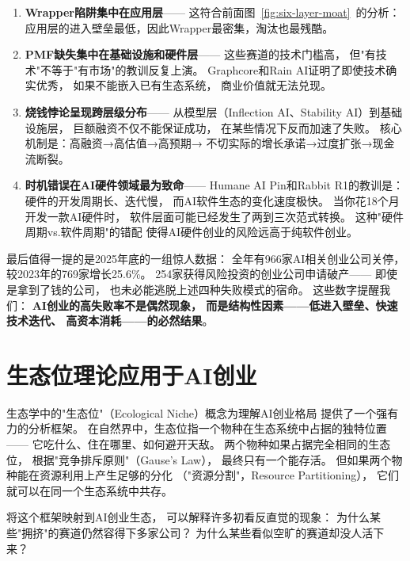\begin{enumerate}
  \item \textbf{Wrapper陷阱集中在应用层}——
    这符合前面图~\ref{fig:six-layer-moat}~的分析：
    应用层的进入壁垒最低，因此Wrapper最密集，淘汰也最残酷。
  \item \textbf{PMF缺失集中在基础设施和硬件层}——
    这些赛道的技术门槛高，
    但"有技术"不等于"有市场"的教训反复上演。
    Graphcore和Rain AI证明了即使技术确实优秀，
    如果不能嵌入已有生态系统，
    商业价值就无法兑现。
  \item \textbf{烧钱悖论呈现跨层级分布}——
    从模型层（Inflection AI、Stability AI）到基础设施层，
    巨额融资不仅不能保证成功，
    在某些情况下反而加速了失败。
    核心机制是：高融资→高估值→高预期→
    不切实际的增长承诺→过度扩张→现金流断裂。
  \item \textbf{时机错误在AI硬件领域最为致命}——
    Humane AI Pin和Rabbit R1的教训是：
    硬件的开发周期长、迭代慢，
    而AI软件生态的变化速度极快。
    当你花18个月开发一款AI硬件时，
    软件层面可能已经发生了两到三次范式转换。
    这种"硬件周期vs.软件周期"的错配
    使得AI硬件创业的风险远高于纯软件创业。
\end{enumerate}

最后值得一提的是2025年底的一组惊人数据：
全年有966家AI相关创业公司关停，
较2023年的769家增长25.6\%。
254家获得风险投资的创业公司申请破产——
即使是拿到了钱的公司，
也未必能逃脱上述四种失败模式的宿命。
这些数字提醒我们：
\textbf{AI创业的高失败率不是偶然现象，
而是结构性因素——低进入壁垒、快速技术迭代、
高资本消耗——的必然结果}。


\section{生态位理论应用于AI创业}
\label{sec:patterns-niches}

生态学中的"生态位"（Ecological Niche）概念为理解AI创业格局
提供了一个强有力的分析框架。
在自然界中，生态位指一个物种在生态系统中占据的独特位置——
它吃什么、住在哪里、如何避开天敌。
两个物种如果占据完全相同的生态位，
根据"竞争排斥原则"（Gause's Law），
最终只有一个能存活。
但如果两个物种能在资源利用上产生足够的分化
（"资源分割"，Resource Partitioning），
它们就可以在同一个生态系统中共存。

将这个框架映射到AI创业生态，
可以解释许多初看反直觉的现象：
为什么某些"拥挤"的赛道仍然容得下多家公司？
为什么某些看似空旷的赛道却没人活下来？

